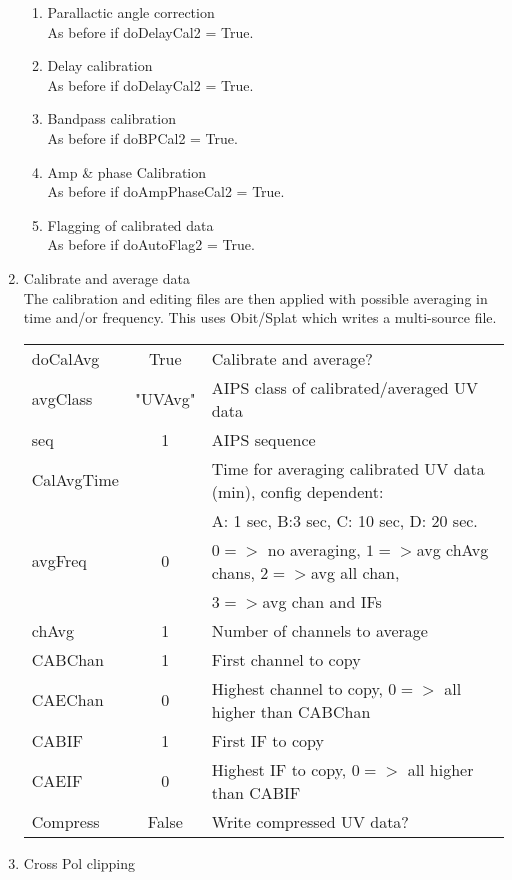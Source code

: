 \documentclass[11pt]{article}
\begin{document}
\begin{enumerate}
\begin{enumerate}
\item Parallactic angle correction\\
As before if doDelayCal2 = True.
\item Delay calibration\\
As before if doDelayCal2 = True.
\item Bandpass calibration\\
As before if doBPCal2 = True.
\item Amp \& phase Calibration \\
As before if doAmpPhaseCal2 = True.
\item Flagging of calibrated data\\
As before if doAutoFlag2 = True.
\end{enumerate}
\item Calibrate and average data\\
The calibration and editing files are then applied with possible
averaging in time and/or frequency.
This uses Obit/Splat which writes a multi-source file.
\begin{center}
\begin{tabular}{|l|c|l|}
\hline
doCalAvg  & True &  Calibrate and average?\\
avgClass  & "UVAvg" & AIPS class of calibrated/averaged UV data \\
seq  & 1 &  AIPS sequence \\
CalAvgTime  &  &  Time for averaging calibrated UV data (min), config
dependent: \\
 & & A: 1 sec, B:3 sec, C: 10 sec, D: 20 sec. \\
avgFreq  & 0 &  $0=>$ no averaging, $1=>$avg chAvg chans, $2=>$avg all
chan, \\
 & &$3=>$avg chan and IFs\\
chAvg  & 1 & Number of channels to average \\
CABChan& 1 &  First channel to copy \\
CAEChan& 0 &  Highest channel to copy, $0=>$ all higher than CABChan\\
CABIF  & 1 &  First IF to copy \\
CAEIF  & 0 &  Highest IF to copy, $0=>$ all higher than CABIF\\
Compress & False &  Write compressed UV data?\\
\hline
\end{tabular}
\end{center}
%
\item Cross Pol clipping\\

\end{enumerate}
\end{document}
